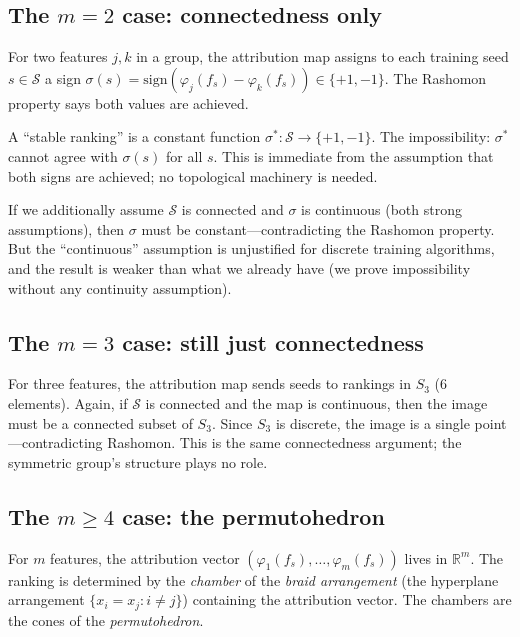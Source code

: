 \documentclass{article}
\begin{document}
\subsection{The $m = 2$ case: connectedness only}

For two features $j, k$ in a group, the attribution map assigns
to each training seed $s \in \mathcal{S}$ a sign
$\sigma(s) = \mathrm{sign}(\varphi_j(f_s) - \varphi_k(f_s)) \in \{+1, -1\}$.
The Rashomon property says both values are achieved.

A ``stable ranking'' is a constant function
$\sigma^* \colon \mathcal{S} \to \{+1, -1\}$.
The impossibility: $\sigma^*$ cannot agree with $\sigma(s)$ for
all $s$. This is immediate from the assumption that both signs
are achieved; no topological machinery is needed.

If we additionally assume $\mathcal{S}$ is connected and $\sigma$
is continuous (both strong assumptions), then $\sigma$ must be
constant---contradicting the Rashomon property. But the
``continuous'' assumption is unjustified for discrete training
algorithms, and the result is weaker than what we already have
(we prove impossibility without any continuity assumption).

\subsection{The $m = 3$ case: still just connectedness}

For three features, the attribution map sends seeds to rankings
in $S_3$ (6 elements). Again, if $\mathcal{S}$ is connected and
the map is continuous, then the image must be a connected subset
of $S_3$. Since $S_3$ is discrete, the image is a single point
---contradicting Rashomon. This is the same connectedness argument;
the symmetric group's structure plays no role.

\subsection{The $m \geq 4$ case: the permutohedron}

For $m$ features, the attribution vector
$(\varphi_1(f_s), \ldots, \varphi_m(f_s))$ lives in $\mathbb{R}^m$.
The ranking is determined by the \emph{chamber} of the
\emph{braid arrangement} (the hyperplane arrangement
$\{x_i = x_j : i \neq j\}$) containing the attribution vector.
The chambers are the cones of the \emph{permutohedron}.
\end{document}
